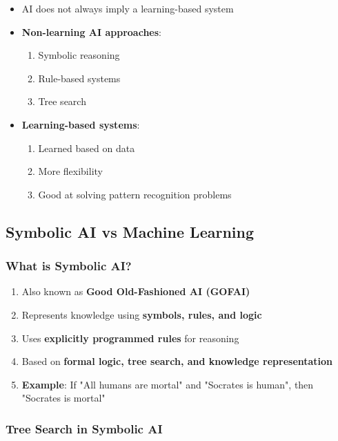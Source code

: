 \begin{itemize}
\item AI does not always imply a learning-based system
\item \textbf{Non-learning AI approaches}:
\begin{enumerate}
\item Symbolic reasoning
\item Rule-based systems
\item Tree search
\end{enumerate}
\item \textbf{Learning-based systems}:
\begin{enumerate}
\item Learned based on data
\item More flexibility
\item Good at solving pattern recognition problems
\end{enumerate}
\end{itemize}

\subsection{Symbolic AI vs Machine Learning}
\label{subsec:symbolic-vs-ml}

\subsubsection{What is Symbolic AI?}
\label{subsubsec:what-is-symbolic-ai}

\begin{enumerate}
\item Also known as \textbf{Good Old-Fashioned AI (GOFAI)}
\item Represents knowledge using \textbf{symbols, rules, and logic}
\item Uses \textbf{explicitly programmed rules} for reasoning
\item Based on \textbf{formal logic, tree search, and knowledge representation}
\item \textbf{Example}: If "All humans are mortal" and "Socrates is human", then "Socrates is mortal"
\end{enumerate}

\subsubsection{Tree Search in Symbolic AI}
\label{subsubsec:tree-search-symbolic}

